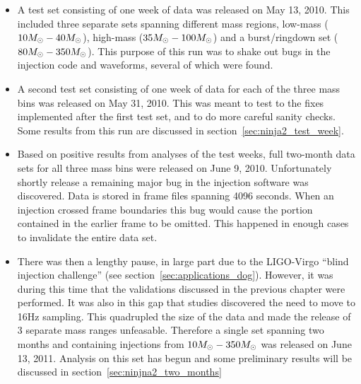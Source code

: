 \begin{itemize}
\item A test set consisting of one week of data was released on May 13, 2010.  This
included three separate sets spanning different mass regions,
low-mass ($10M_\odot - 40 M_\odot$), high-mass ($35 M_\odot - 100 M_\odot$)
and a burst/ringdown set ($80 M_\odot - 350 M_\odot$).  This purpose of
this run was to shake out bugs in the injection code and waveforms,
several of which were found.

\item A second test set consisting of one week of data for each of the
three mass bins was released on May 31, 2010.  This was meant to test
to the fixes implemented after the first test set, and to do more
careful sanity checks.  Some results from this run are discussed in
section~\ref{sec:ninja2_test_week}.

\item Based on positive results from analyses of the test weeks, full
two-month data sets for all three mass bins were released on June 9,
2010.  Unfortunately shortly release a remaining major bug in the
injection software was discovered.  Data is stored in frame files
spanning 4096 seconds.  When an injection crossed frame boundaries
this bug would cause the portion contained in the earlier frame to be
omitted.  This happened in enough cases to invalidate the entire data
set.

\item There was then a lengthy pause, in large part due to the
LIGO-Virgo ``blind injection challenge'' (see
section~\ref{sec:applications_dog}).  However, it was during this time
that the validations discussed in the previous chapter were performed.
It was also in this gap that studies discovered the need to move to
16Hz sampling.   This quadrupled the size of the data and made the
release of 3 separate mass ranges unfeasable.  Therefore a single set
spanning two months and containing injections from $10 M_\odot - 350
M_\odot$ was released on June 13, 2011.  Analysis on this set has begun
and some preliminary results will be discussed in
section~\ref{sec:ninjna2_two_months}
\end{itemize}


